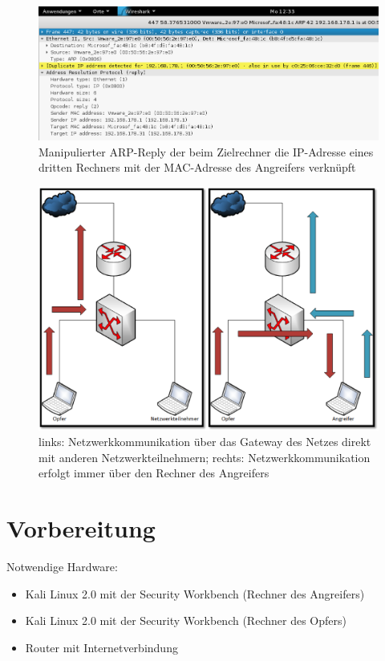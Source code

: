\begin{figure}
	\centering
	\includegraphics[width=\textwidth]{images/ARP_Spoofing/ARP_Fake_Reply}
	\caption{Manipulierter ARP-Reply der beim Zielrechner die IP-Adresse eines dritten Rechners mit der MAC-Adresse des Angreifers verknüpft}
	\label{fig:arp_fake_reply}
\end{figure}

\begin{figure}
	\centering
	\includegraphics[width=\textwidth]{images/ARP_Spoofing/Netzwerkverkehr_Vergleich}
	\caption{links: Netzwerkkommunikation über das Gateway des Netzes direkt mit anderen Netzwerkteilnehmern; rechts: Netzwerkkommunikation erfolgt immer über den Rechner des Angreifers}
	\label{fig:netzwerkverkehr_vergleich}
\end{figure}

\section{Vorbereitung}
Notwendige Hardware:

\begin{itemize}
	\item Kali Linux 2.0 mit der Security Workbench (Rechner des Angreifers)
	\item Kali Linux 2.0 mit der Security Workbench (Rechner des Opfers)
	\item Router mit Internetverbindung
\end{itemize}

